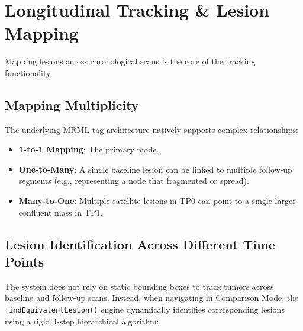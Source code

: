 \documentclass[a4paper,10pt]{article}
\begin{document}
\section{Longitudinal Tracking \& Lesion Mapping}
Mapping lesions across chronological scans is the core of the tracking functionality.

\subsection{Mapping Multiplicity}
The underlying MRML tag architecture natively supports complex relationships:
\begin{itemize}
    \item \textbf{1-to-1 Mapping}: The primary mode.
    \item \textbf{One-to-Many}: A single baseline lesion can be linked to multiple follow-up segments (e.g., representing a node that fragmented or spread).
    \item \textbf{Many-to-One}: Multiple satellite lesions in TP0 can point to a single larger confluent mass in TP1.
\end{itemize}

\subsection{Lesion Identification Across Different Time Points}
The system does not rely on static bounding boxes to track tumors across baseline and follow-up scans. Instead, when navigating in Comparison Mode, the \texttt{findEquivalentLesion()} engine dynamically identifies corresponding lesions using a rigid 4-step hierarchical algorithm:
\end{document}

